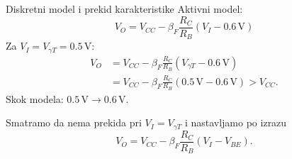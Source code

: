 \begin{frame}[label=10-s015]{Diskretni model i prekid karakteristike}
\setlength{\abovedisplayskip}{4pt}\setlength{\belowdisplayskip}{4pt}\setlength{\abovedisplayshortskip}{3pt}\setlength{\belowdisplayshortskip}{3pt}
Aktivni model:
\[V_O=V_{CC}-\beta_F\frac{R_C}{R_B}(V_I-0.6\,\mathrm{V})\]
Za $V_I=V_{\gamma T}=0.5\,\mathrm{V}$:
\[\begin{aligned}V_O&=V_{CC}-\beta_F\frac{R_C}{R_B}(V_{\gamma T}-0.6\,\mathrm{V})\\
&=V_{CC}-\beta_F\frac{R_C}{R_B}(0.5\,\mathrm{V}-0.6\,\mathrm{V})>V_{CC}.
\end{aligned}\]
\bigskip
Skok modela: $0.5\,\mathrm{V}\longrightarrow0.6\,\mathrm{V}$.\par
Smatramo da nema prekida pri $V_I=V_{\gamma T}$ i nastavljamo po izrazu
\[V_O=V_{CC}-\beta_F\frac{R_C}{R_B}(V_I-V_{BE}).\]
\end{frame}
